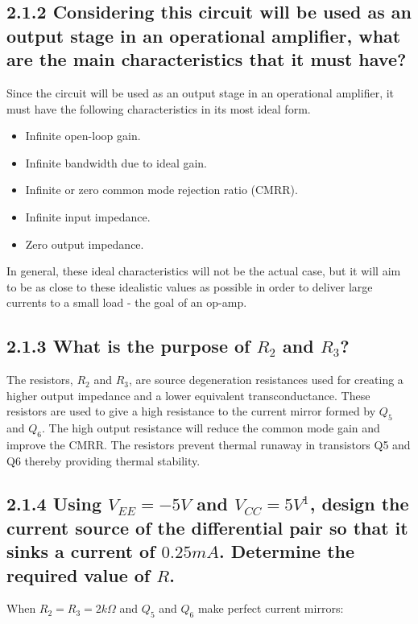 \documentclass[12pt]{article}
\begin{document}
\subsection*{2.1.2 Considering this circuit will be used as an output stage in an operational amplifier, what are the main characteristics that it must have?}

Since the circuit will be used as an output stage in an operational amplifier, it must have the following characteristics in its most ideal form.


\begin{itemize}
    \item Infinite open-loop gain.
    \item Infinite bandwidth due to ideal gain.
    \item Infinite or zero common mode rejection ratio (CMRR).
    \item Infinite input impedance.
    \item Zero output impedance.
\end{itemize}

In general, these ideal characteristics will not be the actual case, but it will aim to be as close to these idealistic values as possible in order to deliver large currents to a small load - the goal of an op-amp.

\subsection*{2.1.3 What is the purpose of $R_2$ and $R_3$?}

The resistors, $R_2$ and $R_3$, are source degeneration resistances used for creating a higher output impedance and a lower equivalent transconductance. These resistors are used to give a high resistance to the current mirror formed by $Q_5$ and $Q_6$. The high output resistance will reduce the common mode gain and improve the CMRR. The resistors prevent thermal runaway in transistors Q5 and Q6 thereby providing thermal stability.

\subsection*{2.1.4 Using $V_{EE} = -5V$ and $V_{CC} = 5V^1$, design the current source of the differential pair so that it sinks a current of $0.25mA$. Determine the required value of $R$.}

When $R_2 = R_3 = 2k\Omega$ and $Q_5$ and $Q_6$ make perfect current mirrors: \\
\end{document}
